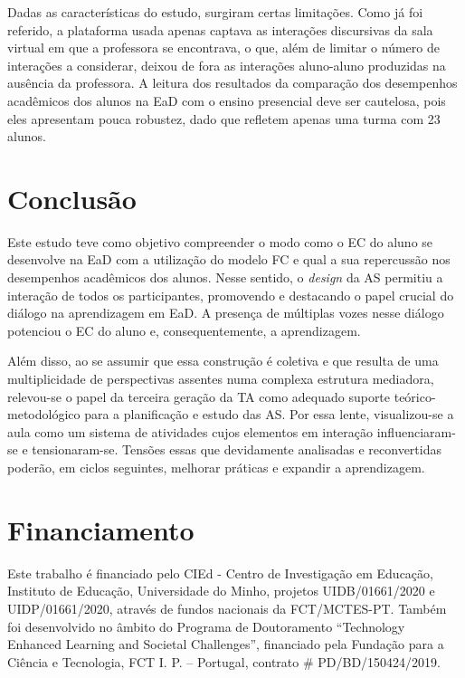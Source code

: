 \documentclass[portuguese]{textolivre}
\begin{document}
Dadas as características do estudo, surgiram certas limitações. Como já foi referido, a plataforma usada apenas captava as interações discursivas da sala virtual em que a professora se encontrava, o que, além de limitar o número de interações a considerar, deixou de fora as interações aluno-aluno produzidas na ausência da professora. A leitura dos resultados da comparação dos desempenhos acadêmicos dos alunos na EaD com o ensino presencial deve ser cautelosa, pois eles apresentam pouca robustez, dado que refletem apenas uma turma com 23 alunos.  

\section{Conclusão}\label{sec-organizacao-latex}
Este estudo teve como objetivo compreender o modo como o EC do aluno se desenvolve na EaD com a utilização do modelo FC e qual a sua repercussão nos desempenhos acadêmicos dos alunos. Nesse sentido, o \textit{design} da AS permitiu a interação de todos os participantes, promovendo e destacando o papel crucial do diálogo na aprendizagem em EaD. A presença de múltiplas vozes nesse diálogo potenciou o EC do aluno e, consequentemente, a aprendizagem. 

Além disso, ao se assumir que essa construção é coletiva e que resulta de uma multiplicidade de perspectivas assentes numa complexa estrutura mediadora, relevou-se o papel da terceira geração da TA como adequado suporte teórico-metodológico para a planificação e estudo das AS. Por essa lente, visualizou-se a aula como um sistema de atividades cujos elementos em interação influenciaram-se e tensionaram-se. Tensões essas que devidamente analisadas e reconvertidas poderão, em ciclos seguintes, melhorar práticas e expandir a aprendizagem.

\section{Financiamento}\label{sec-organizacao-latex}
Este trabalho é financiado pelo CIEd - Centro de Investigação em Educação, Instituto de Educação, Universidade do Minho, projetos UIDB/01661/2020 e UIDP/01661/2020, através de fundos nacionais da FCT/MCTES-PT. Também foi desenvolvido no âmbito do Programa de Doutoramento “Technology Enhanced Learning and Societal Challenges”, financiado pela Fundação para a Ciência e Tecnologia, FCT I. P. – Portugal, contrato \# PD/BD/150424/2019.

\printbibliography\label{sec-bib}
\end{document}
